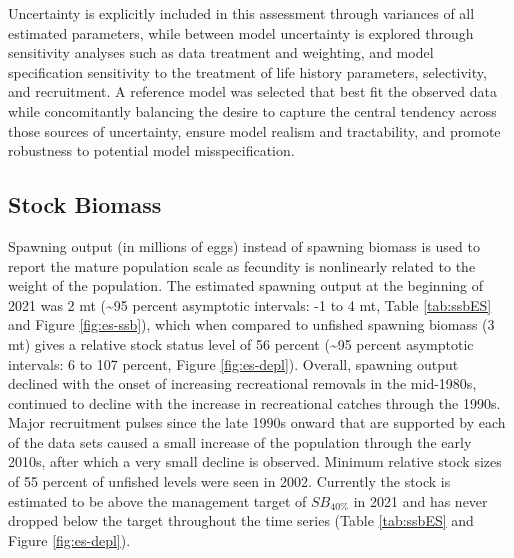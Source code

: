 \documentclass[11pt,
  english,
  a4paper,
]{article}
\begin{document}

Uncertainty is explicitly included in this assessment through variances of all estimated parameters, while between model uncertainty is explored through sensitivity analyses such as data treatment and weighting, and model specification sensitivity to the treatment of life history parameters, selectivity, and recruitment. A reference model was selected that best fit the observed data while concomitantly balancing the desire to capture the central tendency across those sources of uncertainty, ensure model realism and tractability, and promote robustness to potential model misspecification.

\leavevmode\tagmcend\tagstructend\par


\hypertarget{stock-biomass}{%
\subsection*{Stock Biomass}\label{stock-biomass}}

\leavevmode\tagmcend\tagstructend


Spawning output (in millions of eggs) instead of spawning biomass is used to report the mature population scale as fecundity is nonlinearly related to the weight of the population. The estimated spawning output at the beginning of 2021 was 2 mt (\textasciitilde95 percent asymptotic intervals: -1 to 4 mt, Table \ref{tab:ssbES} and Figure \ref{fig:es-ssb}), which when compared to unfished spawning biomass (3 mt) gives a relative stock status level of 56 percent (\textasciitilde95 percent asymptotic intervals: 6 to 107 percent, Figure \ref{fig:es-depl}). Overall, spawning output declined with the onset of increasing recreational removals in the mid-1980s, continued to decline with the increase in recreational catches through the 1990s. Major recruitment pulses since the late 1990s onward that are supported by each of the data sets caused a small increase of the population through the early 2010s, after which a very small decline is observed. Minimum relative stock sizes of 55 percent of unfished levels were seen in 2002. Currently the stock is estimated to be above the management target of {\(SB_{40\%}\)\leavevmode\tagmcend\tagstructend} in 2021 and has never dropped below the target throughout the time series (Table \ref{tab:ssbES} and Figure \ref{fig:es-depl}).
\end{document}
